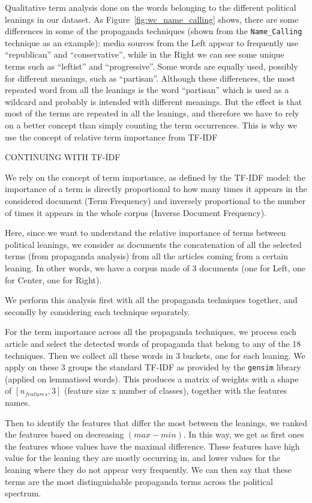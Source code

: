 Qualitative term analysis done on the words belonging to the different political leanings in our dataset. As Figure~\ref{fig:wc_name_calling} shows, there are some differences in some of the propaganda techniques (shown from the \texttt{Name\_Calling} technique as an example):
media sources from the Left appear to frequently use ``republican'' and ``conservative'', while in the Right we can see some unique terms such as ``leftist'' and ``progressive''. Some words are equally used, possibly for different meanings, such as ``partisan''.  
Although these differences, the most repeated word from all the leanings is the word ``partisan'' which is used as a wildcard and probably is intended with different meanings.
But the effect is that most of the terms are repeated in all the leanings, and therefore we have to rely on a better concept than simply counting the term occurrences. 
This is why we use the concept of relative term importance from TF-IDF




CONTINUING WITH TF-IDF

We rely on the concept of term importance, as defined by the TF-IDF model: the importance of a term is directly proportional to how many times it appears in the considered document (Term Frequency) and inversely proportional to the number of times it appears in the whole corpus (Inverse Document Frequency).

Here, since we want to understand the relative importance of terms between political leanings, we consider as documents the concatenation of all the selected terms (from propaganda analysis) from all the articles coming from a certain leaning. In other words, we have a corpus made of 3 documents (one for Left, one for Center, one for Right).

We perform this analysis first with all the propaganda techniques together, and secondly by considering each technique separately.

For the term importance across all the propaganda techniques, we process each article and select the detected words of propaganda that belong to any of the 18 techniques. Then we collect all these words in 3 buckets, one for each leaning.
We apply on these 3 groups the standard TF-IDF as provided by the \texttt{gensim} library (applied on lemmatised words).
This produces a matrix of weights with a shape of $[n_{features}, 3]$ (feature size x number of classes), together with the features names.

Then to identify the features that differ the most between the leanings, we ranked the features based on decreasing $(max - min)$. In this way, we get as first ones the features whose values have the maximal difference.
These features have high value for the leaning they are mostly occurring in, and lower values for the leaning where they do not appear very frequently.
We can then say that these terms are the most distinguishable propaganda terms across the political spectrum.

